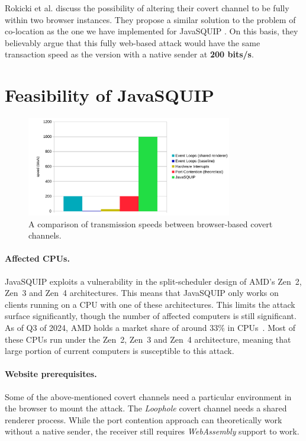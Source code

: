 \documentclass[11pt,
  titlepage=false,
]{scrreprt}
\begin{document}
Rokicki et al. discuss the possibility of altering their covert channel to be fully within two browser instances.
They propose a similar solution to the problem of co-location as the one we have implemented for JavaSQUIP .
On this basis, they believably argue that this fully web-based attack would have the same transaction speed as the version
with a native sender at \textbf{200 bits/s}.

\section{Feasibility of JavaSQUIP}
\begin{figure}
\centering
\includegraphics[width=0.8\textwidth]{figures/speedcomparison}

\caption{A comparison of transmission speeds between browser-based covert channels.}
\label{fig:speedcomparison}
\end{figure}

\paragraph{Affected CPUs.}
JavaSQUIP exploits a vulnerability in the split-scheduler design of AMD's Zen~2, Zen~3 and Zen~4 architectures.
This means that JavaSQUIP only works on clients running on a CPU with one of these architectures.
This limits the attack surface significantly, though the number of affected computers is still significant.
As of Q3 of 2024, AMD holds a market share of around $33\%$ in CPUs~\cite{amdmarket}.
Most of these CPUs run under the Zen~2, Zen~3 and Zen~4 architecture,
meaning that large portion of current computers is susceptible to this attack.

\paragraph{Website prerequisites.}
Some of the above-mentioned covert channels need a particular environment in the browser to mount the attack.
The \textit{Loophole} covert channel needs a shared renderer process.
While the port contention approach can theoretically work without a native sender,
the receiver still requires \textit{WebAssembly} support to work.
\end{document}
